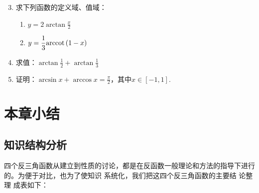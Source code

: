 \begin{enumerate}\setcounter{enumi}{2}
    \item 求下列函数的定义域、值域：
\begin{multicols}{2}
\begin{enumerate}[(1)]
    \item $y=2\arctan \frac{x}{2}$
    \item $y=\dfrac{1}{3}{\rm arccot\,} (1-x)$
\end{enumerate}
\end{multicols}

\item 求值：$\arctan\frac{1}{2}+\arctan\frac{1}{3}$
\item 证明：$\arcsin x+\arccos x=\frac{\pi}{2}$，其中$x\in[-1,1]$.

\end{enumerate}


\section{本章小结}

\subsection{知识结构分析}
四个反三角函数从建立到性质的讨论，都是在反函数一般理论和方法的指导下进行的。为便于对比，也为了使知识
系统化，我们把这四个反三角函数的主要结 论整理 成表如下：

\newpage

